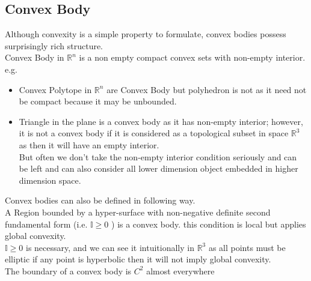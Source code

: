 \documentclass[oneside]{book}
\begin{document}
	\subsection{Convex Body}
	\label{ss:18}
	Although convexity is a simple property to formulate, convex bodies possess surprisingly rich structure. \\
	Convex Body in  $\mathbb{R}^n$  is a non empty compact convex sets with non-empty interior.
	e.g.
	\begin{itemize}
		\item
		
		Convex Polytope in $\mathbb{R}^n$ are Convex Body but polyhedron is not as it need not be compact because it may be unbounded.
		\item 
		Triangle in the plane is a convex body as it has non-empty interior; however, it is not a convex body if it is considered as a topological subset in space  $\mathbb{R}^3$ as then it will have an empty interior. 
		\\  
		But often we don't take the non-empty interior condition seriously and can be left and can also consider all lower dimension object embedded in higher dimension space.
		
		
	\end{itemize}
	
	Convex bodies can also be defined in following way.\\
	A Region  bounded by a hyper-surface with non-negative definite second fundamental form (i.e. $\mathbb{I} \geq 0 $ ) is a convex body. this condition is local but  applies global convexity. \\
	$\mathbb{I} \geq 0 $ is necessary, and we can see it intuitionally in  $\mathbb{R}^3$ as all points must be elliptic if any point is hyperbolic then it will not imply global convexity. \\
	The boundary of a convex body is $C^{2}$ almost everywhere   \\\\
	
	
	
	
	
	
	
	
	
\end{document}
